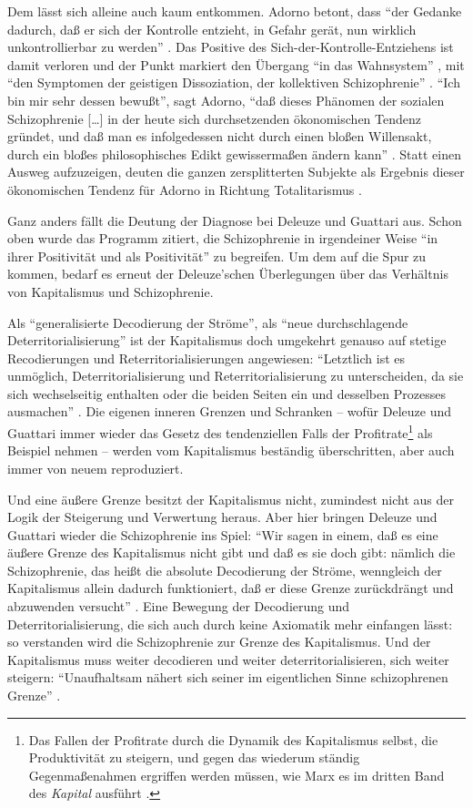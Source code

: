 \documentclass[12pt,
               paper=a4,
               twoside=false,
               onehalfspacing,
               bibliography=totoc,
               toc=graduated,
               ]{scrartcl}
\newcommand{\lips}{\dots\unkern}
\newcommand{\pc}[2]{\parencite[#1]{#2}}
\newcommand{\vgl}[2]{\parencite[vgl.][#1]{#2}}
\newcommand{\dg}{Deleuze und Guattari\xspace}
\begin{document}
Dem lässt sich alleine auch kaum entkommen. Adorno betont, dass "`der
Gedanke dadurch, daß er sich der Kontrolle entzieht, in Gefahr gerät,
nun wirklich unkontrollierbar zu werden"' \pc{229}{vla}. Das Positive
des Sich-der-Kontrolle-Entziehens ist damit verloren und der Punkt
markiert den Übergang "`in das Wahnsystem"' \pc{229}{vla}, mit "`den
Symptomen der geistigen Dissoziation, der kollektiven Schizophrenie"'
\pc{229}{vla}. "`Ich bin mir sehr dessen bewußt"', sagt Adorno, "`daß
dieses Phänomen der sozialen Schizophrenie [\lips] in der heute sich
durchsetzenden ökonomischen Tendenz gründet, und daß man es
infolgedessen nicht durch einen bloßen Willensakt, durch ein bloßes
philosophisches Edikt gewissermaßen ändern kann"' \pc{274}{vla}. Statt
einen Ausweg aufzuzeigen, deuten die ganzen zersplitterten Subjekte
als Ergebnis dieser ökonomischen Tendenz für Adorno in Richtung
Totalitarismus \vgl{263}{min}.

Ganz anders fällt die Deutung der Diagnose bei \dg aus.
Schon oben wurde das Programm zitiert, die Schizophrenie in
irgendeiner Weise "`in ihrer Positivität und als Positivität"'
\pc{24}{schizg} zu begreifen. Um dem auf die Spur zu kommen, bedarf es
erneut der Deleuze'schen Überlegungen über das Verhältnis von
Kapitalismus und Schizophrenie.

Als "`generalisierte Decodierung der Ströme"', als "`neue
durchschlagende Deterritorialisierung"' \pc{288}{ao} ist der
Kapitalismus doch umgekehrt genauso auf stetige Recodierungen und
Reterritorialisierungen angewiesen: "`Letztlich ist es unmöglich,
Deterritorialisierung und Reterritorialisierung zu unterscheiden, da
sie sich wechselseitig enthalten oder die beiden Seiten ein und
desselben Prozesses ausmachen"' \pc{333}{ao}. Die eigenen inneren
Grenzen und Schranken -- wofür \dg immer wieder das Gesetz des
tendenziellen Falls der Profitrate\footnote{Das Fallen der Profitrate
durch die Dynamik des Kapitalismus selbst, die Produktivität zu
steigern, und gegen das wiederum ständig Gegenmaßenahmen ergriffen
werden müssen, wie Marx es im dritten Band des \emph{Kapital} ausführt
\vgl{221-277}{kap3}.} als Beispiel nehmen \vgl{S. 334 f.}{ao} --
werden vom Kapitalismus beständig überschritten, aber auch immer von
neuem reproduziert.

Und eine äußere Grenze besitzt der Kapitalismus nicht, zumindest nicht
aus der Logik der Steigerung und Verwertung heraus. Aber hier bringen
Deleuze und Guattari wieder die Schizophrenie ins Spiel: "`Wir sagen
in einem, daß es eine äußere Grenze des Kapitalismus nicht gibt und
daß es sie doch gibt: nämlich die Schizophrenie, das heißt die
absolute Decodierung der Ströme, wenngleich der Kapitalismus allein
dadurch funktioniert, daß er diese Grenze zurückdrängt und abzuwenden
versucht"' \pc{322}{ao}. Eine Bewegung der Decodierung und
Deterritorialisierung, die sich auch durch keine Axiomatik mehr
einfangen lässt: so verstanden wird die Schizophrenie zur Grenze des
Kapitalismus. Und der Kapitalismus muss weiter decodieren und weiter
deterritorialisieren, sich weiter steigern: "`Unaufhaltsam nähert sich
seiner im eigentlichen Sinne schizophrenen Grenze"' \pc{44}{ao}.
\end{document}
